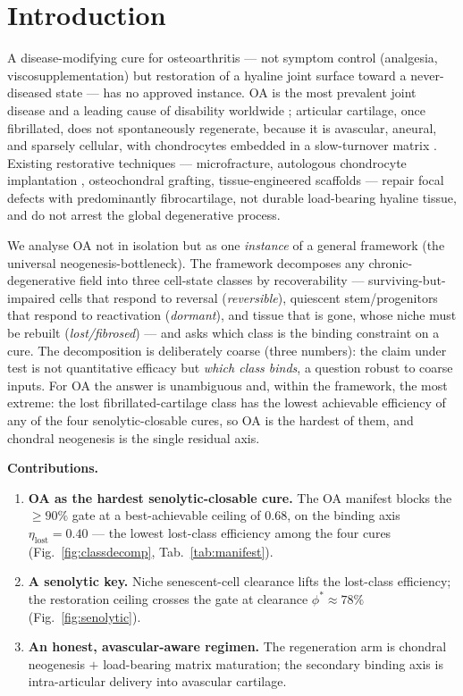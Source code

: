 \documentclass[11pt,a4paper]{article}
\begin{document}
\section{Introduction}
\label{sec:intro}
A disease-modifying cure for osteoarthritis --- not symptom control (analgesia,
viscosupplementation) but restoration of a hyaline joint surface toward a
never-diseased state --- has no approved instance. OA is the most prevalent joint
disease and a leading cause of disability worldwide \citep{hunter2019}; articular
cartilage, once fibrillated, does not spontaneously regenerate, because it is avascular,
aneural, and sparsely cellular, with chondrocytes embedded in a slow-turnover matrix
\citep{sophia2009}. Existing restorative techniques --- microfracture, autologous
chondrocyte implantation \citep{brittberg1994}, osteochondral grafting, tissue-engineered
scaffolds \citep{makris2015} --- repair focal defects with predominantly fibrocartilage,
not durable load-bearing hyaline tissue, and do not arrest the global degenerative
process.

We analyse OA not in isolation but as one \emph{instance} of a general framework
(the universal neogenesis-bottleneck). The framework decomposes any chronic-degenerative
field into three cell-state classes by recoverability --- surviving-but-impaired cells
that respond to reversal (\emph{reversible}), quiescent stem/progenitors that respond to
reactivation (\emph{dormant}), and tissue that is gone, whose niche must be rebuilt
(\emph{lost/fibrosed}) --- and asks which class is the binding constraint on a cure. The
decomposition is deliberately coarse (three numbers): the claim under test is not
quantitative efficacy but \emph{which class binds}, a question robust to coarse inputs.
For OA the answer is unambiguous and, within the framework, the most extreme: the lost
fibrillated-cartilage class has the lowest achievable efficiency of any of the four
senolytic-closable cures, so OA is the hardest of them, and chondral neogenesis is the
single residual axis.

\medskip\noindent\textbf{Contributions.}
\begin{enumerate}\itemsep0.3em
\item \textbf{OA as the hardest senolytic-closable cure.} The OA manifest blocks the
$\geq 90\%$ gate at a best-achievable ceiling of $0.68$, on the binding axis
$\eta_{\text{lost}}=0.40$ --- the lowest lost-class efficiency among the four cures
(Fig.~\ref{fig:classdecomp}, Tab.~\ref{tab:manifest}).
\item \textbf{A senolytic key.} Niche senescent-cell clearance lifts the lost-class
efficiency; the restoration ceiling crosses the gate at clearance
$\phi^\ast\!\approx\!78\%$ (Fig.~\ref{fig:senolytic}).
\item \textbf{An honest, avascular-aware regimen.} The regeneration arm is chondral
neogenesis $+$ load-bearing matrix maturation; the secondary binding axis is
intra-articular delivery into avascular cartilage.
\end{enumerate}
\end{document}
